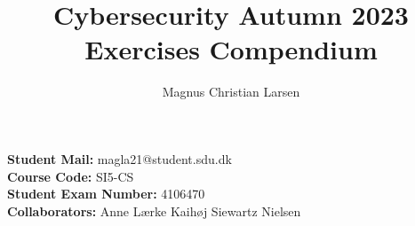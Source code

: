 \documentclass{article}
\title{%
    \bf{Cybersecurity Autumn 2023} \\
    \large Exercises Compendium
}
\author{Magnus Christian Larsen}
\begin{document}
\lstset{
    frame=shadowbox,
    numberstyle=\footnotesize,
    frame=single,
    breaklines=true
}


\maketitle
\begin{center}
    \textbf{Student Mail: }magla21@student.sdu.dk \\
    \textbf{Course Code: }SI5-CS\\
    \textbf{Student Exam Number: }4106470\\
    \textbf{Collaborators:} Anne Lærke Kaihøj Siewartz Nielsen
\end{center}
\vspace*{\fill}
\newpage
\tableofcontents
\newpage








\end{document}
